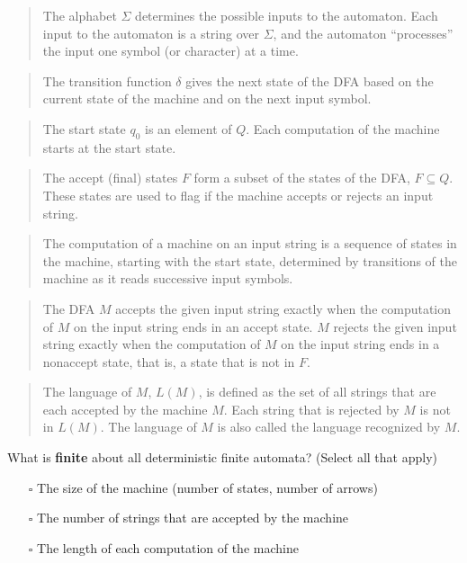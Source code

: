\documentclass[12pt, oneside]{article}
\begin{document}
\begin{quote}  
The alphabet $\Sigma$ determines the possible inputs to the automaton. 
Each input to the automaton is a string over  $\Sigma$, and the automaton ``processes'' the input
one symbol (or character) at a time.
\end{quote}

\begin{quote}
The transition function $\delta$ gives the next state of the DFA based on the current state of 
the machine and on the next input symbol.
\end{quote}

\begin{quote}
The start state $q_0$ is an element of $Q$.  Each computation of the machine starts at the  start  state.
\end{quote}

\begin{quote}
The accept (final) states $F$ form a subset of the states of the DFA, $F \subseteq  Q$. 
These states are used to flag if the machine accepts or rejects an input string.
\end{quote}


\begin{quote}
The computation of a machine on an input string is a sequence of states
in the machine,  starting with the start state, determined by transitions 
of the machine as it reads successive input symbols.
\end{quote}

\begin{quote}
The DFA $M$ accepts the given input string exactly when the computation of $M$ on the input string
ends in an accept state. $M$ rejects the given input string exactly when the computation of 
$M$ on the input string ends in a nonaccept state, that is, a state that is not in $F$.
\end{quote}

\begin{quote} 
The language of $M$, $L(M)$, is defined as the set of  all strings that are each accepted 
by the machine $M$. Each string that is rejected by $M$ is not in $L(M)$.
The language of $M$ is also called the language recognized by $M$.
\end{quote}   
   
What is {\bf finite} about all deterministic finite automata? (Select all that apply)
\begin{itemize}
   \item[$\square$] The size of the machine (number of states, number of arrows)
   \item[$\square$] The number of strings that are accepted by the machine
   \item[$\square$] The length of each computation of the machine
\end{itemize}
  
\end{document}

